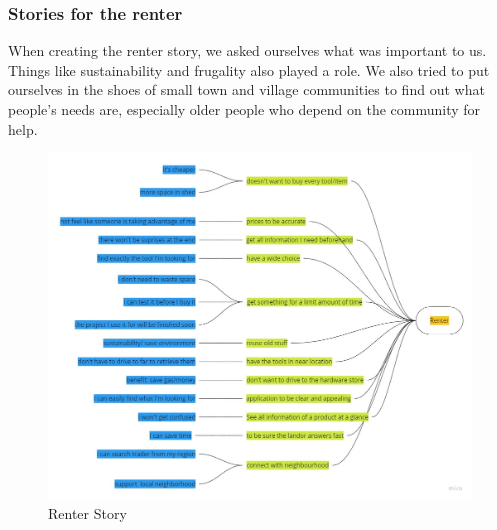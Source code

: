 \subsubsection{Stories for the renter}
When creating the renter story, we asked ourselves what was important to us. Things like sustainability and frugality also played a role. We also tried to put ourselves in the shoes of small town and village communities to find out what people's needs are, especially older people who depend on the community for help.
\begin{figure}[H]
	\centering
	\includegraphics[width=\linewidth]{abb/2_context_of_use/story_renting.jpg}
	\caption{Renter Story}
	\label{fig:story_renter}
\end{figure}

\pagebreak
